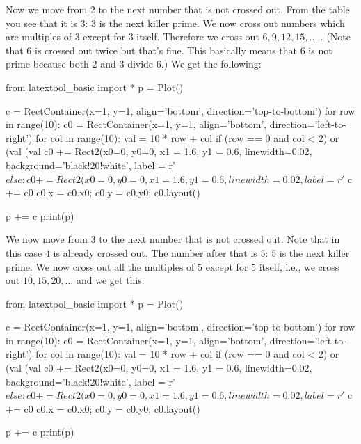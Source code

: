 Now we move from $2$ to the next number that is not crossed out. From the
table you see that it is $3$: $3$ is the next killer prime. We now cross
out numbers which are multiples of $3$ except for $3$ itself. Therefore we
cross out $6, 9, 12, 15, \dots$ . (Note that $6$ is crossed out twice but
that's fine. This basically means that $6$ is not prime because both $2$
and $3$ divide $6$.) We get the following:

\begin{python}
from latextool_basic import *
p = Plot()

c = RectContainer(x=1, y=1, align='bottom', direction='top-to-bottom')
for row in range(10):
    c0 = RectContainer(x=1, y=1, align='bottom', direction='left-to-right')
    for col in range(10):
        val = 10 * row + col
        if (row == 0 and col < 2) or (val %
           (val %
            c0 += Rect2(x0=0, y0=0, x1 = 1.6, y1 = 0.6, linewidth=0.02,
                        background='black!20!white', 
                        label = r'$%
        else:
            c0 += Rect2(x0=0, y0=0, x1 = 1.6, y1 = 0.6, linewidth=0.02, 
                        label = r'$%
    c += c0
    c0.x = c0.x0; c0.y = c0.y0; c0.layout()

p += c
print(p)
\end{python}

We now move from $3$ to the next number that is not crossed out. Note that
in this case $4$ is already crossed out. The number after that is $5$: $5$
is the next killer prime. We now cross out all the multiples of $5$ except
for $5$ itself, i.e., we cross out $10, 15, 20, \dots$ and we get this:

\begin{python}
from latextool_basic import *
p = Plot()

c = RectContainer(x=1, y=1, align='bottom', direction='top-to-bottom')
for row in range(10):
    c0 = RectContainer(x=1, y=1, align='bottom', direction='left-to-right')
    for col in range(10):
        val = 10 * row + col
        if (row == 0 and col < 2) or (val %
           (val %
            c0 += Rect2(x0=0, y0=0, x1 = 1.6, y1 = 0.6, linewidth=0.02,
                        background='black!20!white', 
                        label = r'$%
        else:
            c0 += Rect2(x0=0, y0=0, x1 = 1.6, y1 = 0.6, linewidth=0.02, 
                        label = r'$%
    c += c0
    c0.x = c0.x0; c0.y = c0.y0; c0.layout()

p += c
print(p)
\end{python}

